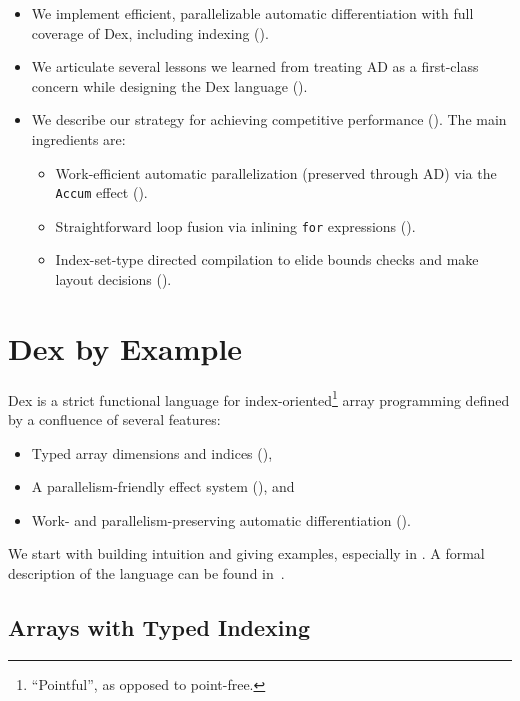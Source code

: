 \documentclass[acmsmall,screen,nonacm]{acmart}
\newcommand{\ttt}[1]{\texttt{#1}}
\begin{document}
\begin{itemize}
  \item We implement efficient, parallelizable automatic differentiation with full coverage of Dex, including indexing ().
  \item We articulate several lessons we learned from treating AD as a first-class concern while designing the Dex language ().
  \item We describe our strategy for achieving competitive performance ().  The main ingredients are:
  \begin{itemize}
    \item Work-efficient automatic parallelization (preserved through AD) via the \ttt{Accum} effect ().
    \item Straightforward loop fusion via inlining \ttt{for} expressions ().
    \item Index-set-type directed compilation to elide bounds checks and make layout decisions ().
  \end{itemize}
\end{itemize}


\section{Dex by Example}
\label{sec:expressiveness}

Dex is a strict functional language for index-oriented\footnote{``Pointful'', as opposed to point-free.} array programming defined by a confluence of several features:
\begin{itemize}
    \item Typed array dimensions and indices (),
    \item A parallelism-friendly effect system (), and
    \item Work- and parallelism-preserving automatic differentiation ().
\end{itemize}
We start with building intuition and giving examples, especially in .
A formal description of the language can be found in~.

\subsection{Arrays with Typed Indexing}
\label{sec:typed-indexing}
\end{document}
